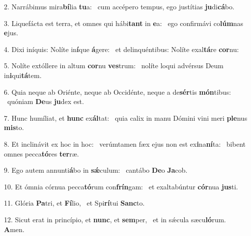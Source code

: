 2. Narrábimus mira\textbf{bí}lia \textbf{tu}a: \ast\  cum accépero tempus, ego justítias \textbf{ju}di\textbf{cá}bo.\

3. Liquefácta est terra, et omnes qui hábi\textbf{tant} in \textbf{e}a: \ast\  ego confirmávi co\textbf{lúm}nas \textbf{e}jus.\

4. Dixi iníquis: Nolíte in\textbf{í}que \textbf{á}gere: \ast\  et delinquéntibus: Nolíte exal\textbf{tá}re \textbf{cor}nu:\

5. Nolíte extóllere in altum \textbf{cor}nu \textbf{ves}trum: \ast\  nolíte loqui advérsus Deum in\textbf{i}qui\textbf{tá}tem.\

6. Quia neque ab Oriénte, neque ab Occidénte, neque a de\textbf{sér}tis \textbf{món}tibus: \ast\  quóniam \textbf{De}us \textbf{ju}dex est.\

7. Hunc humíliat, et \textbf{hunc} ex\textbf{ál}tat: \ast\  quia calix in manu Dómini vini meri \textbf{ple}nus \textbf{mis}to.\

8. Et inclinávit ex hoc in hoc: \dag\  verúmtamen fæx ejus non est ex\textbf{i}na\textbf{ní}ta: \ast\  bibent omnes pecca\textbf{tó}res \textbf{ter}ræ.\

9. Ego autem annunti\textbf{á}bo in \textbf{sǽ}culum: \ast\  cantábo \textbf{De}o \textbf{Ja}cob.\

10. Et ómnia córnua pecca\textbf{tó}rum con\textbf{frín}gam: \ast\  et exaltabúntur \textbf{cór}nua \textbf{jus}ti.\

11. Glória \textbf{Pa}tri, et \textbf{Fí}lio, \ast\  et Spi\textbf{rí}tui \textbf{Sanc}to.\

12. Sicut erat in princípio, et \textbf{nunc}, et \textbf{sem}per, \ast\  et in sǽcula sæcu\textbf{ló}rum. \textbf{A}men.\

